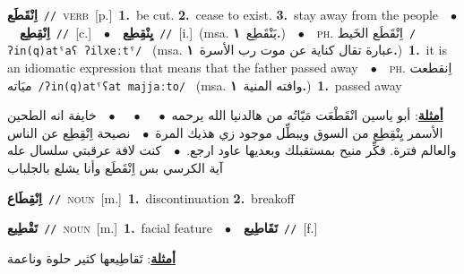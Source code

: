 \documentclass[10pt,a4paper,twoside]{article} %
\begin{document}
\begin{multicols}{2}
{\setlength\topsep{0pt}\textbf{\foreignlanguage{arabic}{اِنْقَطَع}}\ {\color{gray}\texttt{//}\color{black}}\ \textsc{verb}\ [p.]\ \textbf{1.}~be cut.  \textbf{2.}~cease to exist.  \textbf{3.}~stay away from the people\ \ $\bullet$\ \ \setlength\topsep{0pt}\textbf{\foreignlanguage{arabic}{اِنْقِطِع}}\ {\color{gray}\texttt{//}\color{black}}\ [c.]\ \ $\bullet$\ \ \setlength\topsep{0pt}\textbf{\foreignlanguage{arabic}{يِنْقِطِع}}\ {\color{gray}\texttt{//}\color{black}}\ [i.]\ \color{gray}(msa. \foreignlanguage{arabic}{يَنْقَطِع}~\foreignlanguage{arabic}{\textbf{١.}})\color{black}\ \ $\bullet$\ \ \textsc{ph.} \color{gray} \foreignlanguage{arabic}{اِنْقَطَع الخَيط}\color{black}\ {\color{gray}\texttt{/{\sffamily ʔin(q)atˤaʕ ʔilxeːtˤ}/}\color{black}}\ \color{gray} (msa. \foreignlanguage{arabic}{عبارة تقال كناية عن موت رب الأسرة}~\foreignlanguage{arabic}{\textbf{١.}})\color{black}\ \textbf{1.}~it is an idiomatic expression that means that the father passed away\ \ $\bullet$\ \ \textsc{ph.} \color{gray} \foreignlanguage{arabic}{اِنقطعت ميَاته}\color{black}\ {\color{gray}\texttt{/{\sffamily ʔin(q)atˤʕat majjaːto}/}\color{black}}\ \color{gray} (msa. \foreignlanguage{arabic}{وافته المنية}~\foreignlanguage{arabic}{\textbf{١.}})\color{black}\ \textbf{1.}~passed away\  \begin{flushright}\color{gray}\foreignlanguage{arabic}{\textbf{\underline{\foreignlanguage{arabic}{أمثلة}}}: أبو ياسين انْقَطْعَت مَيّاتُه من هالدنيا الله يرحمه\ $\bullet$\ \  \ $\bullet$\ \  \ $\bullet$\ \  خايفة انه الطحين الأسمر يِنْقِطِع من السوق ويبطِّل موجود زي هذيك المرة\ $\bullet$\ \  نصيحة اِنْقِطِع عن الناس والعالم فترة. فكِّر منيح بمستقبلك وبعديها عاود ارجع.\ $\bullet$\ \  كنت لافة عرقبتي سلسال عله آية الكرسي بس اِنْقَطَع وأنا يشلع بالجلباب}\end{flushright}\color{black}} \vspace{2mm}

{\setlength\topsep{0pt}\textbf{\foreignlanguage{arabic}{اِنْقِطَاع}}\ {\color{gray}\texttt{//}\color{black}}\ \textsc{noun}\ [m.]\ \textbf{1.}~discontinuation  \textbf{2.}~breakoff\ } \vspace{2mm}

{\setlength\topsep{0pt}\textbf{\foreignlanguage{arabic}{تَقْطِيع}}\ {\color{gray}\texttt{//}\color{black}}\ \textsc{noun}\ [m.]\ \textbf{1.}~facial feature\ \ $\bullet$\ \ \setlength\topsep{0pt}\textbf{\foreignlanguage{arabic}{تَقَاطِيع}}\ {\color{gray}\texttt{//}\color{black}}\ [f.]\  \begin{flushright}\color{gray}\foreignlanguage{arabic}{\textbf{\underline{\foreignlanguage{arabic}{أمثلة}}}: تَقاطِيعها كثير حلوة وناعمة}\end{flushright}\color{black}} \vspace{2mm}


\end{multicols}
\end{document}
